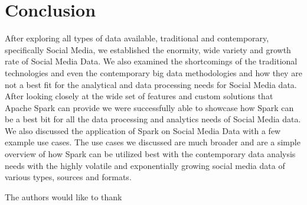 \documentclass[sigconf]{acmart}
\begin{document}
\section{Conclusion}
After exploring all types of data available, traditional and contemporary, specifically Social Media, we established the enormity, wide variety and growth rate of Social Media Data. We also examined the shortcomings of the traditional technologies and even the contemporary big data methodologies and how they are not a best fit for the analytical and data processing needs for Social Media data. After looking closely at the wide set of features and custom solutions that Apache Spark can provide we were successfully able to showcase how Spark can be a best bit for all the data processing and analytics needs of Social Media data. We also discussed the application of Spark on Social Media Data with a few example use cases. The use cases we discussed are much broader and are a simple overview of how Spark can be utilized best with the contemporary data analysis needs with the highly volatile and exponentially growing social media data of various types, sources and formats.
\begin{acks}

  The authors would like to thank 

\end{acks}


 
\end{document}
